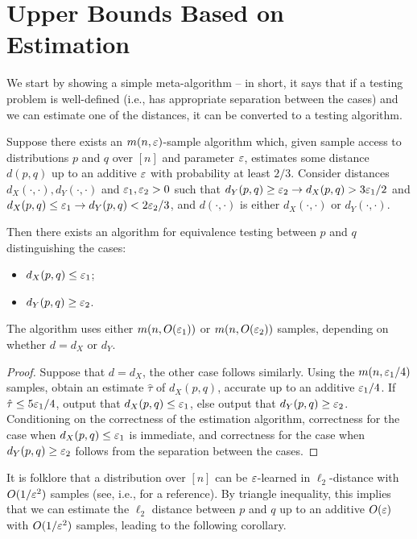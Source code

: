 \section{Upper Bounds Based on Estimation}
\label{sec:est-ub}

We start by showing a simple meta-algorithm -- in short, it says that if a testing problem is well-defined (i.e., has appropriate separation between the cases) and we can estimate one of the distances, it can be converted to a testing algorithm.
\begin{theorem}\label{thm:est-ub}
Suppose there exists an $m(n, \varepsilon)$-sample algorithm which, given sample access to distributions $p$ and $q$ over $[n]$ and parameter $\varepsilon$, estimates some distance $d(p,q)$ up to an additive $\varepsilon$ with probability at least $2/3$.
Consider distances $d_X(\cdot, \cdot), d_Y(\cdot, \cdot)$ and $\varepsilon_1, \varepsilon_2 > 0$ such that $ d_Y(p,q) \geq \varepsilon_2 \rightarrow d_X(p,q) > 3\varepsilon_1/2$ and $d_X(p,q) \leq \varepsilon_1 \rightarrow d_Y(p,q) < 2\varepsilon_2/3$, and $d(\cdot, \cdot)$ is either $d_X(\cdot, \cdot)$ or $d_Y(\cdot, \cdot)$.

Then there exists an algorithm for equivalence testing between $p$ and $q$ distinguishing the cases:
\begin{itemize}
\item $d_X(p,q) \leq \varepsilon_1$;
\item $d_Y(p,q) \geq \varepsilon_2$.
\end{itemize}
The algorithm uses either $m(n, O(\varepsilon_1))$ or $m(n, O(\varepsilon_2))$ samples, depending on whether $d = d_X$ or $d_Y$.
\end{theorem}
\begin{proof}
Suppose that $d = d_X$, the other case follows similarly.
Using the $m(n, \varepsilon_1/4)$ samples, obtain an estimate $\hat \tau$ of $d_X(p,q)$, accurate up to an additive $\varepsilon_1/4$.
If $\hat \tau \leq 5\varepsilon_1/4$, output that $d_X(p,q) \leq \varepsilon_1$, else output that $d_Y(p,q) \geq \varepsilon_2$. 
Conditioning on the correctness of the estimation algorithm, correctness for the case when $d_X(p,q) \leq \varepsilon_1$ is immediate, and correctness for the case when $d_Y(p,q) \geq \varepsilon_2$ follows from the separation between the cases.
\end{proof}

It is folklore that a distribution over $[n]$ can be $\varepsilon$-learned in $\ell_2$-distance with $O(1/\varepsilon^2)$ samples (see, i.e., \cite{ChanDVV14, Waggoner15} for a reference).
By triangle inequality, this implies that we can estimate the $\ell_2$ distance between $p$ and $q$ up to an additive $O(\varepsilon)$ with $O(1/\varepsilon^2)$ samples, leading to the following corollary.

